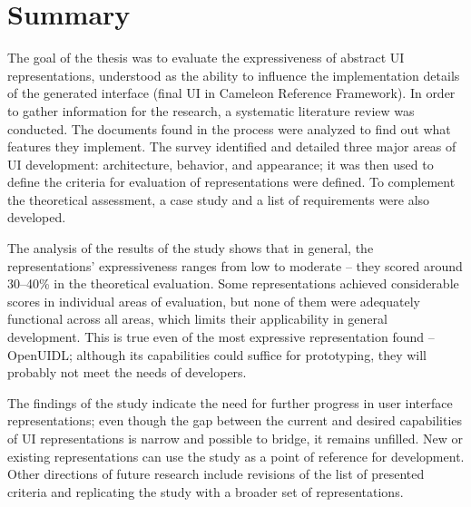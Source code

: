 \chapter{Summary}\label{ch:summary}

The goal of the thesis was to evaluate the expressiveness of abstract UI representations, understood as the ability to influence the implementation details of the generated interface (final UI in Cameleon Reference Framework).
In order to gather information for the research, a systematic literature review was conducted.
The documents found in the process were analyzed to find out what features they implement.
The survey identified and detailed three major areas of UI development: architecture, behavior, and appearance; it was then used to define the criteria for evaluation of representations were defined.
To complement the theoretical assessment, a case study and a list of requirements were also developed.

The analysis of the results of the study shows that in general, the representations' expressiveness ranges from low to moderate -- they scored around 30--40\% in the theoretical evaluation.
Some representations achieved considerable scores in individual areas of evaluation, but none of them were adequately functional across all areas, which limits their applicability in general development.
This is true even of the most expressive representation found -- OpenUIDL; although its capabilities could suffice for prototyping, they will probably not meet the needs of developers.

The findings of the study indicate the need for further progress in user interface representations;
even though the gap between the current and desired capabilities of UI representations is narrow and possible to bridge, it remains unfilled.
New or existing representations can use the study as a point of reference for development.
Other directions of future research include revisions of the list of presented criteria and replicating the study with a broader set of representations.
